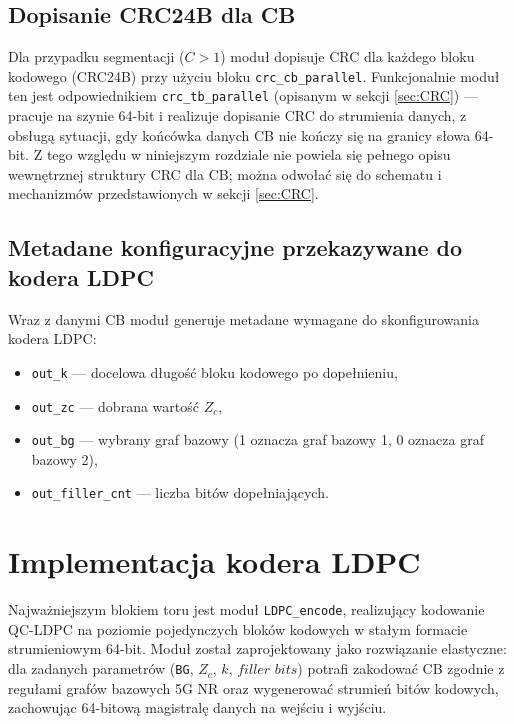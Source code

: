 \subsection{Dopisanie CRC24B dla CB}
\label{subsec:ldpc_prep_crc_cb}

Dla przypadku segmentacji ($C>1$) moduł dopisuje CRC dla każdego bloku kodowego (CRC24B) przy użyciu bloku \texttt{crc\_cb\_parallel}. Funkcjonalnie moduł ten jest odpowiednikiem \texttt{crc\_tb\_parallel} (opisanym w sekcji \ref{sec:CRC}) --- pracuje na szynie 64-bit i realizuje dopisanie CRC do strumienia danych, z obsługą sytuacji, gdy końcówka danych CB nie kończy się na granicy słowa 64-bit. Z tego względu w niniejszym rozdziale nie powiela się pełnego opisu wewnętrznej struktury CRC dla CB; można odwołać się do schematu i mechanizmów przedstawionych w sekcji \ref{sec:CRC}.

\subsection{Metadane konfiguracyjne przekazywane do kodera LDPC}
\label{subsec:ldpc_prep_metadata}

Wraz z danymi CB moduł generuje metadane wymagane do skonfigurowania kodera LDPC:
\begin{itemize}
  \item \texttt{out\_k} --- docelowa długość bloku kodowego po dopełnieniu,
  \item \texttt{out\_zc} --- dobrana wartość $Z_c$,
  \item \texttt{out\_bg} --- wybrany graf bazowy (1 oznacza graf bazowy 1, 0 oznacza graf bazowy 2),
  \item \texttt{out\_filler\_cnt} --- liczba bitów dopełniających.
\end{itemize}

\section{Implementacja kodera LDPC}
\label{sec:ldpc_encoder_impl}

Najważniejszym blokiem toru jest moduł \texttt{LDPC\_encode}, realizujący kodowanie QC-LDPC na poziomie pojedynczych bloków kodowych w stałym formacie strumieniowym 64-bit. Moduł został zaprojektowany jako rozwiązanie elastyczne: dla zadanych parametrów (\texttt{BG}, $Z_c$, $k$, $filler$ $bits$) potrafi zakodować CB zgodnie z regułami grafów bazowych 5G NR oraz wygenerować strumień bitów kodowych, zachowując 64-bitową magistralę danych na wejściu i wyjściu.

